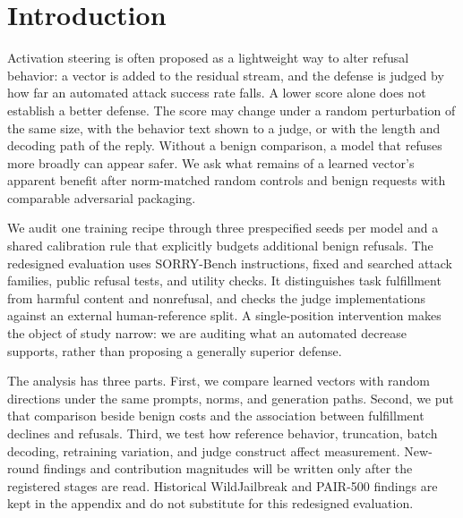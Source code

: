 \section{Introduction}
\label{sec:introduction}
Activation steering is often proposed as a lightweight way to alter refusal behavior: a vector is added to the residual stream, and the defense is judged by how far an automated attack success rate falls. A lower score alone does not establish a better defense. The score may change under a random perturbation of the same size, with the behavior text shown to a judge, or with the length and decoding path of the reply. Without a benign comparison, a model that refuses more broadly can appear safer. We ask what remains of a learned vector's apparent benefit after norm-matched random controls and benign requests with comparable adversarial packaging.

We audit one training recipe through three prespecified seeds per model and a shared calibration rule that explicitly budgets additional benign refusals. The redesigned evaluation uses SORRY-Bench instructions, fixed and searched attack families, public refusal tests, and utility checks. It distinguishes task fulfillment from harmful content and nonrefusal, and checks the judge implementations against an external human-reference split. A single-position intervention makes the object of study narrow: we are auditing what an automated decrease supports, rather than proposing a generally superior defense.

The analysis has three parts. First, we compare learned vectors with random directions under the same prompts, norms, and generation paths. Second, we put that comparison beside benign costs and the association between fulfillment declines and refusals. Third, we test how reference behavior, truncation, batch decoding, retraining variation, and judge construct affect measurement. New-round findings and contribution magnitudes will be written only after the registered stages are read. Historical WildJailbreak and PAIR-500 findings are kept in the appendix and do not substitute for this redesigned evaluation.

